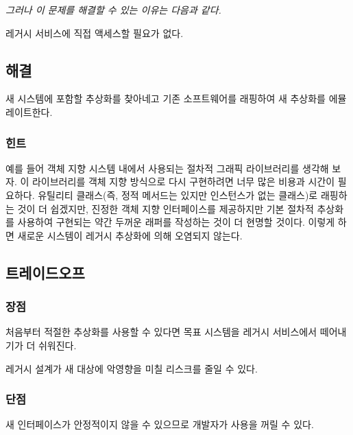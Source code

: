 \documentclass[a4paper,10pt,twoside]{book}
\begin{document}
\emph{그러나 이 문제를 해결할 수 있는 이유는 다음과 같다.}

\begin{bulletlist}
\item 레거시 서비스에 직접 액세스할 필요가 없다.
\end{bulletlist}

\subsection*{해결}

새 시스템에 포함할 추상화를 찾아네고 기존 소프트웨어를 래핑하여 새 추상화를 에뮬레이트한다.

\subsubsection*{힌트}

예를 들어 객체 지향 시스템 내에서 사용되는 절차적 그래픽 라이브러리를 생각해 보자. 이 라이브러리를 객체 지향 방식으로 다시 구현하려면 너무 많은 비용과 시간이 필요하다. 유틸리티 클래스(즉, 정적 메서드는 있지만 인스턴스가 없는 클래스)로 래핑하는 것이 더 쉽겠지만, 진정한 객체 지향 인터페이스를 제공하지만 기본 절차적 추상화를 사용하여 구현되는 약간 두꺼운 래퍼를 작성하는 것이 더 현명할 것이다. 이렇게 하면 새로운 시스템이 레거시 추상화에 의해 오염되지 않는다. 

\subsection*{트레이드오프}

\subsubsection*{장점}

\begin{bulletlist}
\item 처음부터 적절한 추상화를 사용할 수 있다면 목표 시스템을 레거시 서비스에서 떼어내기가 더 쉬워진다.

\item 레거시 설계가 새 대상에 악영향을 미칠 리스크를 줄일 수 있다.
\end{bulletlist}

\subsubsection*{단점}

\begin{bulletlist}
\item 새 인터페이스가 안정적이지 않을 수 있으므로 개발자가 사용을 꺼릴 수 있다.
\end{bulletlist}
\end{document}
